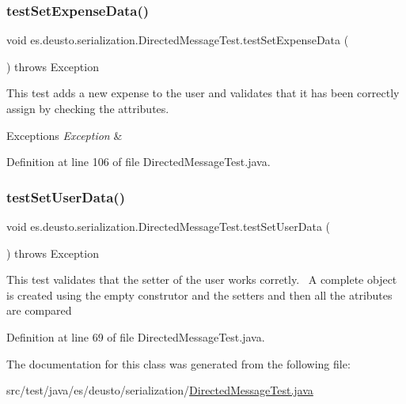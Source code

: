 \subsubsection{\texorpdfstring{test\+Set\+Expense\+Data()}{testSetExpenseData()}}
{\footnotesize\ttfamily void es.\+deusto.\+serialization.\+Directed\+Message\+Test.\+test\+Set\+Expense\+Data (\begin{DoxyParamCaption}{ }\end{DoxyParamCaption}) throws Exception}

This test adds a new expense to the user and validates that it has been correctly assign by checking the attributes. 
\begin{DoxyExceptions}{Exceptions}
{\em Exception} & \\
\hline
\end{DoxyExceptions}


Definition at line 106 of file Directed\+Message\+Test.\+java.

\mbox{\label{classes_1_1deusto_1_1serialization_1_1_directed_message_test_a91132b0ba7c7932be8b7dfded1e7e74a}} 
\subsubsection{\texorpdfstring{test\+Set\+User\+Data()}{testSetUserData()}}
{\footnotesize\ttfamily void es.\+deusto.\+serialization.\+Directed\+Message\+Test.\+test\+Set\+User\+Data (\begin{DoxyParamCaption}{ }\end{DoxyParamCaption}) throws Exception}

This test validates that the setter of the user works corretly.~\newline
A complete object is created using the empty construtor and the setters and then all the atributes are compared~\newline


Definition at line 69 of file Directed\+Message\+Test.\+java.



The documentation for this class was generated from the following file\+:\begin{DoxyCompactItemize}
\item 
src/test/java/es/deusto/serialization/\hyperlink{_directed_message_test_8java}{Directed\+Message\+Test.\+java}\end{DoxyCompactItemize}
